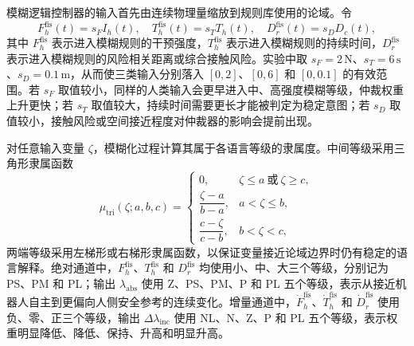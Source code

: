 模糊逻辑控制器的输入首先由连续物理量缩放到规则库使用的论域。令
\begin{equation}
  F_h^{\mathrm{fis}}(t)=s_F I_h(t),\quad
  T_h^{\mathrm{fis}}(t)=s_T T_h(t),\quad
  D_r^{\mathrm{fis}}(t)=s_D D_c(t),
  \label{eq:ch4_fis_inputs}
\end{equation}
其中 $F_h^{\mathrm{fis}}$ 表示进入模糊规则的干预强度，$T_h^{\mathrm{fis}}$ 表示进入模糊规则的持续时间，$D_r^{\mathrm{fis}}$ 表示进入模糊规则的风险相关距离或综合接触风险。实验中取 $s_F=2\,\mathrm{N}$、$s_T=6\,\mathrm{s}$、$s_D=0.1\,\mathrm{m}$，从而使三类输入分别落入 $[0,2]$、$[0,6]$ 和 $[0,0.1]$ 的有效范围。若 $s_F$ 取值较小，同样的人类输入会更早进入中、高强度模糊等级，仲裁权重上升更快；若 $s_T$ 取值较大，持续时间需要更长才能被判定为稳定意图；若 $s_D$ 取值较小，接触风险或空间接近程度对仲裁器的影响会提前出现。

对任意输入变量 $\zeta$，模糊化过程计算其属于各语言等级的隶属度。中间等级采用三角形隶属函数
\begin{equation}
  \mu_{\mathrm{tri}}(\zeta;a,b,c)=
  \begin{cases}
    0, & \zeta\le a\ \text{或}\ \zeta\ge c,\\
    \dfrac{\zeta-a}{b-a}, & a<\zeta\le b,\\
    \dfrac{c-\zeta}{c-b}, & b<\zeta<c ,
  \end{cases}
  \label{eq:ch4_tri_mf}
\end{equation}
两端等级采用左梯形或右梯形隶属函数，以保证变量接近论域边界时仍有稳定的语言解释。绝对通道中，$F_h^{\mathrm{fis}}$、$T_h^{\mathrm{fis}}$ 和 $D_r^{\mathrm{fis}}$ 均使用小、中、大三个等级，分别记为 PS、PM 和 PL；输出 $\lambda_{\mathrm{abs}}$ 使用 Z、PS、PM、P 和 PL 五个等级，表示从接近机器人自主到更偏向人侧安全参考的连续变化。增量通道中，$\dot F_h^{\mathrm{fis}}$、$\dot T_h^{\mathrm{fis}}$ 和 $\dot D_r^{\mathrm{fis}}$ 使用负、零、正三个等级，输出 $\Delta\lambda_{\mathrm{inc}}$ 使用 NL、N、Z、P 和 PL 五个等级，表示权重明显降低、降低、保持、升高和明显升高。

